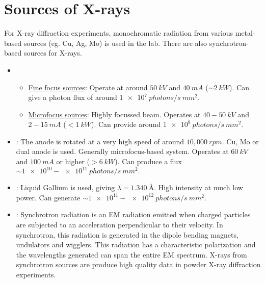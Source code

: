 \section{Sources of X-rays}

	For X-ray diffraction experiments, monochromatic radiation from various metal-based sources (eg. Cu, Ag, Mo) is used in the lab. There are also synchrotron-based sources for X-rays.%
%			
	\begin{itemize}%
%			
	    \item {}%
%			    	
	    	\begin{itemize}[label={$\hookrightarrow$}]%
%			    	
	    	    \item \ul{Fine focus sources}: Operate at around $50~\si{kV}$ and $40~\si{mA}$ ($\sim \SI{2}{kW}$). Can give a photon flux of around $\SI{1e7}{photons/s~mm^2}.$
	    	    
	    	    \item \ul{Microfocus sources}: Highly focussed beam. Operates at $40-50~\si{kV}$ and $2-15~\si{mA}$  ($<\SI{1}{kW}$). Can provide around $\SI{1e8}{photons/s~mm^2}.$
	    	    
	    	\end{itemize}
	    	
	    \item {}: The anode is rotated at a very high speed of around $10,000~\si{rpm}.$ Cu, Mo or dual anode is used. Generally microfocus-based system. Operates at $\SI{60}{kV}$ and $\SI{100}{mA}$ or higher ($> \SI{6}{kW}$). Can produce a flux $\sim \num{1e10}-\num{e11}~\si{photons/s~mm^2}.$
	    
	    \item {}: Liquid Gallium is used, giving $\lambda = \SI{1.340}{\angstrom}.$ High intensity at much low power. Can generate $\sim \num{1e11}-\num{e12}~\si{photons/s~mm^2}.$
	    
	    \item {}: Synchrotron radiation is an EM radiation emitted when charged particles are subjected to an acceleration perpendicular to their velocity. In synchrotron, this radiation is generated in the dipole bending magnets, undulators and wigglers. This radiation has a characteristic polarization and the wavelengths generated can span the entire EM spectrum. X-rays from synchrotron sources are produce high quality data in powder X-ray diffraction experiments.
	    
	\end{itemize}